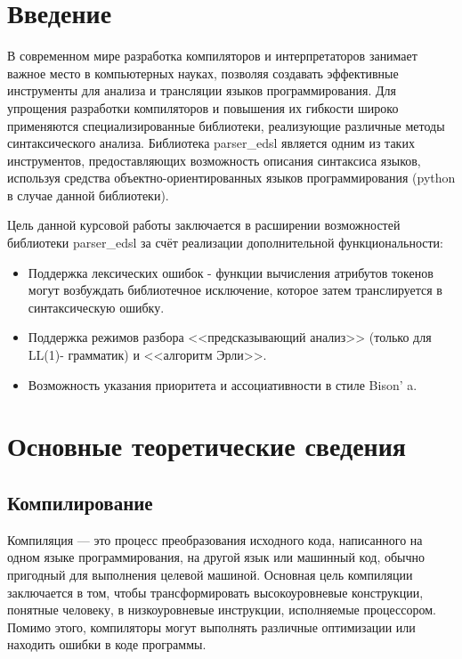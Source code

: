 \documentclass[14pt, russian]{scrartcl}
\newcommand{\anonsection}[1]{\cleardoublepage
\phantomsection
\addcontentsline{toc}{section}{\protect\numberline{}#1}
\section*{#1}\vspace*{2.5ex} %
}
\begin{document}

\setlength{\tabcolsep}{3pt}
\newpage
\setcounter{page}{2}

\newpage
\renewcommand\contentsname{\hfill{\normalfont{СОДЕРЖАНИЕ}}\hfill}  %
\tableofcontents
\newpage
\anonsection{Введение}  %

В современном мире разработка компиляторов и интерпретаторов занимает важное место в компьютерных науках, позволяя
создавать эффективные инструменты для анализа и трансляции языков программирования. Для упрощения разработки
компиляторов и повышения их
гибкости широко применяются специализированные библиотеки, реализующие различные методы синтаксического анализа.
Библиотека parser\_edsl является одним из таких инструментов, предоставляющих возможность описания синтаксиса
языков, используя средства объектно-ориентированных языков программирования (python в случае данной библиотеки).

Цель данной курсовой работы заключается в расширении возможностей библиотеки parser\_edsl
за счёт реализации дополнительной функциональности:

\begin{itemize}
	\item Поддержка лексических ошибок - функции вычисления атрибутов токенов
	могут возбуждать библиотечное исключение, которое затем транслируется
	в синтаксическую ошибку.
	\item Поддержка режимов разбора <<предсказывающий анализ>> (только для LL(1)-
	грамматик) и <<алгоритм Эрли>>.
	\item Возможность указания приоритета и ассоциативности в стиле Bison' a.
\end{itemize}


\section{Основные теоретические сведения}

\subsection{Компилирование}

Компиляция — это процесс преобразования исходного кода, написанного на одном языке программирования,
на другой язык или машинный код,
обычно пригодный для выполнения целевой машиной. Основная цель компиляции заключается в том, чтобы
трансформировать высокоуровневые конструкции, понятные человеку, в низкоуровневые инструкции, исполняемые
процессором. Помимо этого, компиляторы могут выполнять различные оптимизации или находить ошибки в коде программы.
\end{document}
